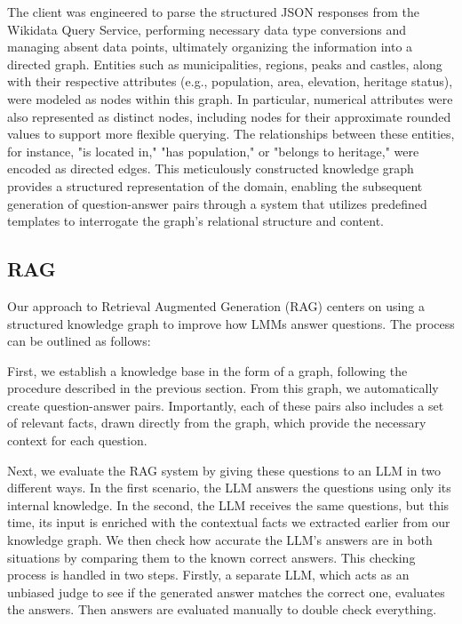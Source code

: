 \documentclass[fleqn,moreauthors,10pt]{ds_report}
\begin{document}
The client was engineered to parse the structured JSON responses from the Wikidata Query Service, performing necessary data type conversions and managing absent data points, ultimately organizing the information into a directed graph. Entities such as municipalities, regions, peaks and castles, along with their respective attributes (e.g., population, area, elevation, heritage status), were modeled as nodes within this graph. In particular, numerical attributes were also represented as distinct nodes, including nodes for their approximate rounded values to support more flexible querying. The relationships between these entities, for instance, "is located in," "has population," or "belongs to heritage," were encoded as directed edges. This meticulously constructed knowledge graph provides a structured representation of the domain, enabling the subsequent generation of question-answer pairs through a system that utilizes predefined templates to interrogate the graph's relational structure and content.

\subsection*{RAG}

Our approach to Retrieval Augmented Generation (RAG) centers on using a structured knowledge graph to improve how LMMs answer questions. The process can be outlined as follows:

First, we establish a knowledge base in the form of a graph, following the procedure described in the previous section. From this graph, we automatically create question-answer pairs. Importantly, each of these pairs also includes a set of relevant facts, drawn directly from the graph, which provide the necessary context for each question.

Next, we evaluate the RAG system by giving these questions to an LLM in two different ways. In the first scenario, the LLM answers the questions using only its internal knowledge. In the second, the LLM receives the same questions, but this time, its input is enriched with the contextual facts we extracted earlier from our knowledge graph. We then check how accurate the LLM's answers are in both situations by comparing them to the known correct answers. This checking process is handled in two steps. Firstly, a separate LLM, which acts as an unbiased judge to see if the generated answer matches the correct one, evaluates the answers. Then answers are evaluated manually to double check everything.
\end{document}

